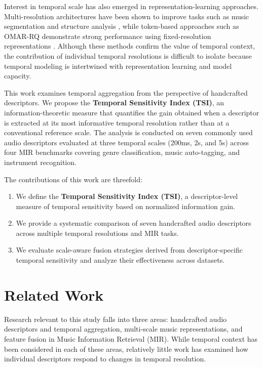 \documentclass[runningheads]{llncs}
\begin{document}
Interest in temporal scale has also emerged in representation-learning approaches. Multi-resolution architectures have been shown to improve tasks such as music segmentation and structure analysis \cite{serra2014unsupervised,buisson2024self}, while token-based approaches such as OMAR-RQ demonstrate strong performance using fixed-resolution representations \cite{alonso2025omar}. Although these methods confirm the value of temporal context, the contribution of individual temporal resolutions is difficult to isolate because temporal modeling is intertwined with representation learning and model capacity.

This work examines temporal aggregation from the perspective of handcrafted descriptors. We propose the \textbf{Temporal Sensitivity Index (TSI)}, an information-theoretic measure that quantifies the gain obtained when a descriptor is extracted at its most informative temporal resolution rather than at a conventional reference scale. The analysis is conducted on seven commonly used audio descriptors evaluated at three temporal scales (200ms, 2s, and 5s) across four MIR benchmarks covering genre classification, music auto-tagging, and instrument recognition.

The contributions of this work are threefold:

\begin{enumerate}
\item We define the \textbf{Temporal Sensitivity Index (TSI)}, a descriptor-level measure of temporal sensitivity based on normalized information gain.
\item We provide a systematic comparison of seven handcrafted audio descriptors across multiple temporal resolutions and MIR tasks.
\item We evaluate scale-aware fusion strategies derived from descriptor-specific temporal sensitivity and analyze their effectiveness across datasets.
\end{enumerate}



\section{Related Work}
Research relevant to this study falls into three areas: handcrafted audio descriptors and temporal aggregation, multi-scale music representations, and feature fusion in Music Information Retrieval (MIR). While temporal context has been considered in each of these areas, relatively little work has examined how individual descriptors respond to changes in temporal resolution.
\end{document}
